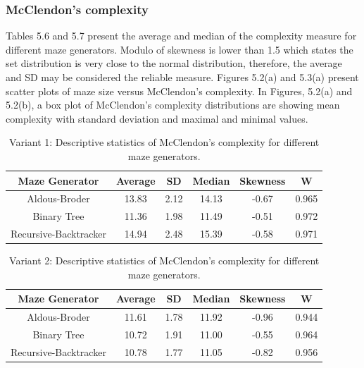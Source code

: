       \subsubsection{McClendon's complexity}
Tables 5.6 and 5.7 present the average and median of the complexity measure for different maze generators. Modulo of skewness is lower than 1.5 which states the set
distribution is very close to the normal distribution, therefore, the average and SD may be considered the reliable measure. Figures 5.2(a) and 5.3(a) present scatter
plots of maze size versus McClendon's complexity. In Figures, 5.2(a) and 5.2(b), a box plot of McClendon's complexity distributions are showing
mean complexity with standard deviation and maximal and minimal values.\\
\begin{table}[!ht]
    \centering
    \caption{Variant 1: Descriptive statistics of McClendon's complexity for different maze generators.} 
    \begin{tabular}{c c c c c c}
    \hline
        Maze Generator & Average & SD & Median & Skewness & W  \\ \hline
        Aldous-Broder & 13.83 & 2.12 & 14.13 & -0.67 & 0.965  \\ 
        Binary Tree  & 11.36 & 1.98 & 11.49 & -0.51 & 0.972 \\ 
        Recursive-Backtracker  & 14.94 & 2.48 & 15.39 & -0.58 & 0.971 \\ \hline
    \end{tabular}
\end{table}  

\begin{table}[!ht]
    \centering
    \caption{Variant 2: Descriptive statistics of McClendon's complexity for different maze generators.} 
    \begin{tabular}{c c c c c c}
    \hline
        Maze Generator & Average & SD & Median & Skewness & W  \\ \hline
        Aldous-Broder & 11.61 & 1.78 & 11.92 & -0.96 & 0.944  \\ 
        Binary Tree & 10.72 & 1.91 & 11.00 & -0.55 & 0.964  \\ 
        Recursive-Backtracker & 10.78 & 1.77 & 11.05 & -0.82 & 0.956  \\ \hline
    \end{tabular}
\end{table}

